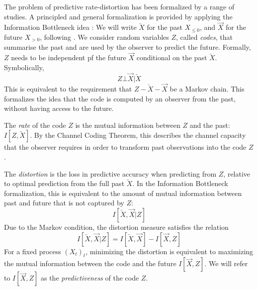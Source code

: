 \documentclass[11pt,letterpaper]{article}
\begin{document}
The problem of predictive rate-distortion has been formalized by a range of studies.
A principled and general formalization is provided by applying the Information Bottleneck idea \citep{still-optimal-2010, marzen-predictive-2016}:
We will write $\overleftarrow{X}$ for the past $X_{\leq 0}$, and $\overrightarrow{X}$ for the future $X_{> 0}$, following \cite{marzen-predictive-2016}.
We consider random variables $Z$, called \emph{codes}, that summarise the past and are used by the observer to predict the future.
Formally, $Z$ needs to be independent pf the future $\overrightarrow{X}$ conditional on the past $\overleftarrow{X}$. Symbolically, 
\begin{equation}
	Z \bot \overrightarrow{X} | \overleftarrow{X}
\end{equation}
This is equivalent to the requirement that $Z - \overleftarrow{X} - \overrightarrow{X}$ be a Markov chain.
This formalizes the idea that the code is computed by an observer from the past, without having access to the future.



The \emph{rate} of the code $Z$ is the mutual information between $Z$ and the past: $I[Z, \overleftarrow{X}]$.
By the Channel Coding Theorem, this describes the channel capacity that the observer requires in order to transform past observations into the code $Z$.

The \emph{distortion} is the loss in predictive accuracy when predicting from $Z$, relative to optimal prediction from the full past $\overleftarrow{X}$.
In the Information Bottleneck formalization, this
is equivalent to the amount of mutual information between past and future that is not captured by $Z$:
\begin{equation}
	I[\overleftarrow{X}, \overrightarrow{X}|Z]
\end{equation}
Due to the Markov condition, the distortion measure satisfies the relation
\begin{equation}
	I[\overleftarrow{X}, \overrightarrow{X}|Z] = I[\overleftarrow{X}, \overrightarrow{X}] - I[\overrightarrow{X}, Z]
\end{equation}
For a fixed process $(X_t)_t$, minimizing the distortion is equivalent to maximizing the mutual information between the code and the future $I[\overrightarrow{X}, Z]$. We will refer to $I[\overrightarrow{X}, Z]$ as the \emph{predictiveness} of the code $Z$.
\end{document}
